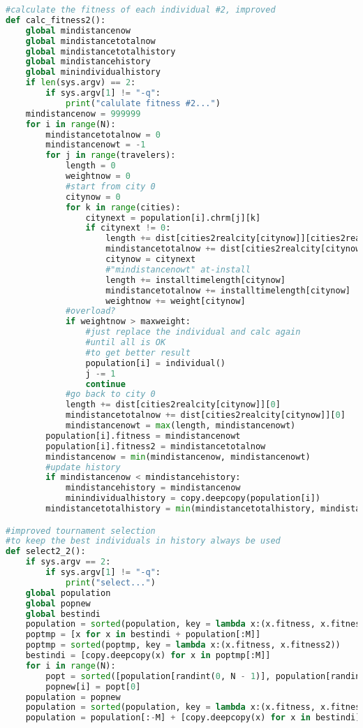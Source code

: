 \documentclass[UTF8,cs4size]{ctexart}
\begin{document}
\begin{lstlisting}[language=Python]
#calculate the fitness of each individual #2, improved
def calc_fitness2():
    global mindistancenow
    global mindistancetotalnow
    global mindistancetotalhistory
    global mindistancehistory
    global minindividualhistory
    if len(sys.argv) == 2:
        if sys.argv[1] != "-q":
            print("calulate fitness #2...")
    mindistancenow = 999999
    for i in range(N):
        mindistancetotalnow = 0
        mindistancenowt = -1
        for j in range(travelers):
            length = 0
            weightnow = 0
            #start from city 0
            citynow = 0
            for k in range(cities):
                citynext = population[i].chrm[j][k]
                if citynext != 0:
                    length += dist[cities2realcity[citynow]][cities2realcity[citynext]]
                    mindistancetotalnow += dist[cities2realcity[citynow]][cities2realcity[citynext]]
                    citynow = citynext
                    #"mindistancenowt" at-install
                    length += installtimelength[citynow]
                    mindistancetotalnow += installtimelength[citynow]
                    weightnow += weight[citynow]
            #overload?
            if weightnow > maxweight:
                #just replace the individual and calc again
                #until all is OK
                #to get better result
                population[i] = individual()
                j -= 1
                continue
            #go back to city 0
            length += dist[cities2realcity[citynow]][0]
            mindistancetotalnow += dist[cities2realcity[citynow]][0]
            mindistancenowt = max(length, mindistancenowt)
        population[i].fitness = mindistancenowt
        population[i].fitness2 = mindistancetotalnow
        mindistancenow = min(mindistancenow, mindistancenowt)
        #update history
        if mindistancenow < mindistancehistory:
            mindistancehistory = mindistancenow
            minindividualhistory = copy.deepcopy(population[i])
        mindistancetotalhistory = min(mindistancetotalhistory, mindistancetotalnow)

#improved tournament selection
#to keep the best individuals in history always be used
def select2_2():
    if sys.argv == 2:
        if sys.argv[1] != "-q":
            print("select...")
    global population
    global popnew
    global bestindi
    population = sorted(population, key = lambda x:(x.fitness, x.fitness2))
    poptmp = [x for x in bestindi + population[:M]]
    poptmp = sorted(poptmp, key = lambda x:(x.fitness, x.fitness2))
    bestindi = [copy.deepcopy(x) for x in poptmp[:M]]
    for i in range(N):
        popt = sorted([population[randint(0, N - 1)], population[randint(0, N - 1)]], key = lambda x:(x.fitness, x.fitness2))
        popnew[i] = popt[0]
    population = popnew
    population = sorted(population, key = lambda x:(x.fitness, x.fitness2))
    population = population[:-M] + [copy.deepcopy(x) for x in bestindi]


\end{lstlisting}
\end{document}
